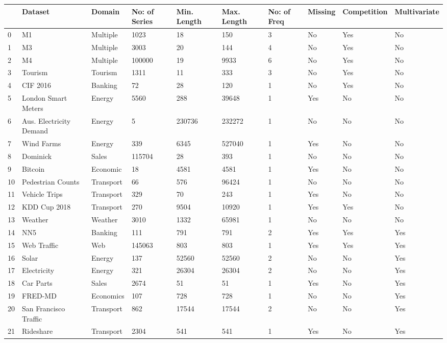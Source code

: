 \begin{tabular}{llllllllll}
\toprule
 & Dataset & Domain & No: of Series & Min. Length & Max. Length & No: of Freq & Missing & Competition & Multivariate \\
\midrule
0 & M1 & Multiple & 1023 & 18 & 150 & 3 & No & Yes & No \\
1 & M3 & Multiple & 3003 & 20 & 144 & 4 & No & Yes & No \\
2 & M4 & Multiple & 100000 & 19 & 9933 & 6 & No & Yes & No \\
3 & Tourism & Tourism & 1311 & 11 & 333 & 3 & No & Yes & No \\
4 & CIF 2016 & Banking & 72 & 28 & 120 & 1 & No & Yes & No \\
5 & London Smart Meters & Energy & 5560 & 288 & 39648 & 1 & Yes & No & No \\
6 & Aus. Electricity Demand & Energy & 5 & 230736 & 232272 & 1 & No & No & No \\
7 & Wind Farms & Energy & 339 & 6345 & 527040 & 1 & Yes & No & No \\
8 & Dominick & Sales & 115704 & 28 & 393 & 1 & No & No & No \\
9 & Bitcoin & Economic & 18 & 4581 & 4581 & 1 & Yes & No & No \\
10 & Pedestrian Counts & Transport & 66 & 576 & 96424 & 1 & No & No & No \\
11 & Vehicle Trips & Transport & 329 & 70 & 243 & 1 & Yes & No & No \\
12 & KDD Cup 2018 & Transport & 270 & 9504 & 10920 & 1 & Yes & Yes & No \\
13 & Weather & Weather & 3010 & 1332 & 65981 & 1 & No & No & No \\
14 & NN5 & Banking & 111 & 791 & 791 & 2 & Yes & Yes & Yes \\
15 & Web Traffic & Web & 145063 & 803 & 803 & 1 & Yes & Yes & Yes \\
16 & Solar & Energy & 137 & 52560 & 52560 & 2 & No & No & Yes \\
17 & Electricity & Energy & 321 & 26304 & 26304 & 2 & No & No & Yes \\
18 & Car Parts & Sales & 2674 & 51 & 51 & 1 & Yes & No & Yes \\
19 & FRED-MD & Economics & 107 & 728 & 728 & 1 & No & No & Yes \\
20 & San Francisco Traffic & Transport & 862 & 17544 & 17544 & 2 & No & No & Yes \\
21 & Rideshare & Transport & 2304 & 541 & 541 & 1 & Yes & No & Yes \\

\end{tabular}
